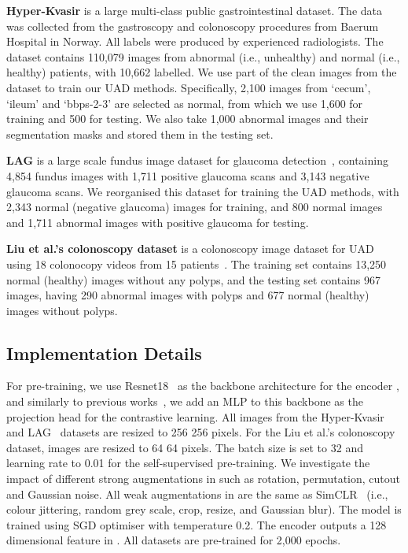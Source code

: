 \documentclass[runningheads]{llncs}
\begin{document}
\textbf{Hyper-Kvasir} is a large multi-class public gastrointestinal dataset. The data was collected from the gastroscopy and colonoscopy procedures from Baerum Hospital in Norway. 
All labels were produced by experienced radiologists. The dataset contains 110,079 images from abnormal (i.e., unhealthy) and normal (i.e., healthy) patients, with 10,662 labelled. We use part of the clean images from the dataset to train our UAD methods. 
Specifically, 2,100 images from `cecum', `ileum' and `bbps-2-3' are selected as normal, from which we use 1,600 for training and 500 for testing. We also take 1,000 abnormal images and their segmentation masks and stored them in the testing set. 

\textbf{LAG} is a large scale fundus image dataset for glaucoma detection~\cite{li2019attention}, containing 4,854 fundus images with 1,711 positive glaucoma scans and 3,143 negative glaucoma scans. We reorganised this dataset for training the UAD methods, with 2,343 normal (negative glaucoma) images for training, and 800 normal images and 1,711 abnormal images with positive glaucoma for testing.  


\textbf{Liu et al.'s colonoscopy dataset} is a colonoscopy image dataset for UAD using 18 colonocopy videos from 15
patients~\cite{liu2019photoshopping}. The training set contains 13,250 normal (healthy) images without any polyps, and the testing set contains 967 images, having 290 abnormal images with polyps and 677 normal (healthy) images without polyps. 

\subsection{Implementation Details}

For pre-training, we use Resnet18~\cite{he2016deep} as the backbone architecture for the encoder , and similarly to previous works~\cite{simclr,sohn2020learning}, we add an MLP to this backbone as the projection head for the contrastive learning. 
All images from the Hyper-Kvasir~\cite{borgli2020hyperkvasir} and LAG~\cite{li2019attention} datasets are resized to 256  256 pixels. 
For the Liu et al.'s colonoscopy dataset, images are resized to 64  64 pixels.  
The batch size is set to 32 and learning rate to 0.01 for the self-supervised pre-training.
We investigate the impact of different strong augmentations in  such as rotation, permutation, cutout and Gaussian noise. 
All weak augmentations in  are the same as SimCLR~\cite{simclr} (i.e., colour jittering, random grey scale, crop, resize, and Gaussian blur). 
The model is trained using SGD optimiser with  temperature 0.2. The encoder  outputs a 128 dimensional feature in . 
All datasets are pre-trained for 2,000 epochs. 
\end{document}
